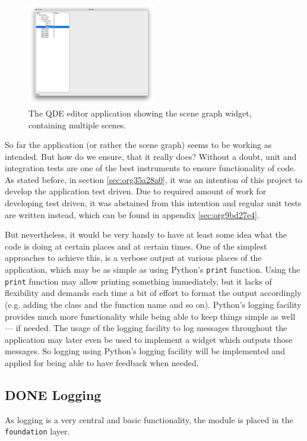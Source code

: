 \documentclass[10pt, openright, notitlepage]{scrreprt}
\begin{document}
\begin{figure}[H]
\centering
\includegraphics[width=0.5\textwidth]{./images/qde_alpha_05.png}
\caption{\label{fig:editor-alpha-04}
The QDE editor application showing the scene graph widget, containing multiple scenes.}
\end{figure}


So far the application (or rather the scene graph) seems to be working as
intended. But how do we ensure, that it really does? Without a doubt, unit and
integration tests are one of the best instruments to ensure functionality of
code. As stated before, in section \ref{sec:org35a28a0}, it was an intention of
this project to develop the application test driven. Due to required amount of
work for developing test driven, it was abstained from this intention and
regular unit tests are written instead, which can be found in appendix \ref{sec:org9bd27e4}.

But nevertheless, it would be very handy to have at least some idea what the
code is doing at certain places and at certain times.
One of the simplest approaches to achieve this, is a verbose output at various
places of the application, which may be as simple as using Python's
\texttt{print} function. Using the \texttt{print} function may allow
printing something immediately, but it lacks of flexibility and demands each
time a bit of effort to format the output accordingly (e.g. adding the class and
the function name and so on). Python's logging facility provides much more
functionality while being able to keep things simple as well --- if needed.
The usage of the logging facility to log messages throughout the application may
later even be used to implement a widget which outputs those messages. So
logging using Python's logging facility will be implemented and applied for
being able to have feedback when needed.
\subsection{{\bfseries\sffamily DONE} Logging}
\label{sec:org396ed03}
As logging is a very central and basic functionality, the module is placed in
the \texttt{foundation} layer.
\end{document}
